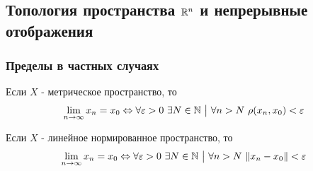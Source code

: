 \subsection{Топология пространства $\mathbb{R}^n$ и непрерывные отображения}

\subsubsection*{Пределы в частных случаях}

\begin{proposition}
	Если $X$ - метрическое пространство, то
	\[
		\lim\limits_{n \to \infty} x_n = x_0 \Leftrightarrow \forall \varepsilon > 0\ \exists N \in \mathbb{N} \ \big|\  \forall n > N\ \rho(x_n, x_0) < \varepsilon
	\]
\end{proposition}

\begin{proposition}
	Если $X$ - линейное нормированное пространство, то
	\[
		\lim\limits_{n \to \infty} x_n = x_0 \Leftrightarrow \forall \varepsilon > 0\ \exists N \in \mathbb{N} \ \big|\  \forall n > N\ \|x_n - x_0\| < \varepsilon
	\]
\end{proposition}

